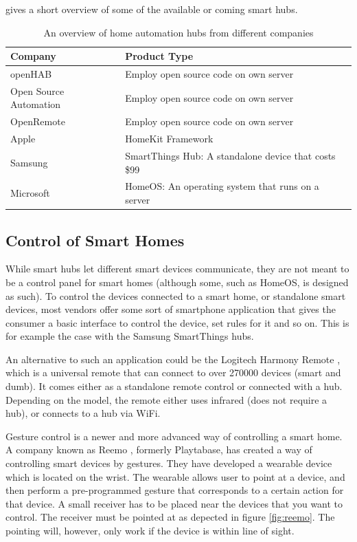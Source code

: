  gives a short overview of some of the available or coming smart hubs. 
\begin{table}
    \centering
    \begin{tabular}{l l}
        Company                           & Product Type \\ \hline
        openHAB \cite{OPENHAB}             & Employ open source code on own server \\
        Open Source Automation \cite{OSA}  & Employ open source code on own server \\
        OpenRemote \cite{OPENREMOTE}       & Employ open source code on own server \\
        Apple \cite{HOMEKIT}               & HomeKit Framework \\
        Samsung \cite{SMARTTHINGS}         & SmartThings Hub: A standalone device that costs \$99 \\
        Microsoft \cite{HOMEOS}            & HomeOS: An operating system that runs on a server
    \end{tabular}
    \caption{An overview of home automation hubs from different companies}
    \label{table:smarthubs}
\end{table}

\subsection{Control of Smart Homes}\label{sec:smarthomecontrol}
While smart hubs let different smart devices communicate, 
they are not meant to be a control panel for smart homes (although some, such as HomeOS, is designed as such).
To control the devices connected to a smart home, or standalone smart devices, 
most vendors offer some sort of smartphone application that gives the consumer a basic interface to control the device, set rules for it and so on.
This is for example the case with the Samsung SmartThings hubs. 

An alternative to such an application could be the Logitech Harmony Remote \cite{HARMONYREMOTE}, 
which is a universal remote that can connect to over \num{270000} devices (smart and dumb). 
It comes either as a standalone remote control or connected with a hub. 
Depending on the model, the remote either uses infrared (does not require a hub), 
or connects to a hub via WiFi. 

Gesture control is a newer and more advanced way of controlling a smart home. 
A company known as Reemo \cite{Reemo}, formerly Playtabase, has created a way of controlling smart devices by gestures. 
They have developed a wearable device which is located on the wrist. The wearable allows user to point at a device, 
and then perform a pre-programmed gesture that corresponds to a certain action for that device. 
A small receiver has to be placed near the devices that you want to control. The receiver must be pointed at as depected in figure \ref{fig:reemo}.
The pointing will, however, only work if the device is within line of sight. 

